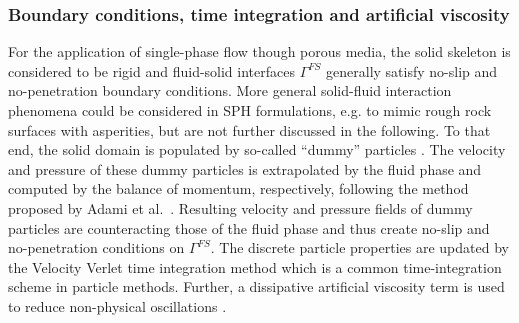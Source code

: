 \subsubsection{Boundary conditions, time integration and artificial viscosity}
For the application of single-phase flow though porous media, the solid skeleton is considered to be rigid and fluid-solid interfaces $\Gamma^{FS}$ generally satisfy no-slip and no-penetration boundary conditions. 
More general solid-fluid interaction phenomena could be considered in SPH formulations, e.g. to mimic rough rock surfaces with asperities, but are not further discussed in the following.
To that end, the solid domain is populated by so-called ``dummy'' particles
. The velocity and pressure of these dummy particles is extrapolated by the fluid phase and computed by the balance of momentum, respectively, following the method proposed by Adami et al.~\cite{adami2012generalized}. Resulting velocity and pressure fields of dummy particles are counteracting those of the fluid phase and thus create no-slip and no-penetration conditions on $\Gamma^{FS}$. 
The discrete particle properties are updated by the Velocity Verlet time integration method \cite{swope1982computer, verlet1967computer} which is a common time-integration scheme in particle methods. Further, a dissipative artificial viscosity term is used to reduce non-physical oscillations \cite{monaghan1992smoothed}.  
